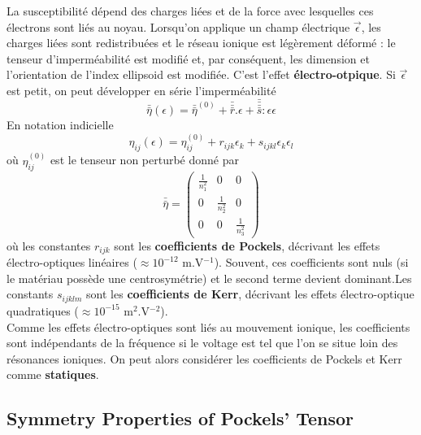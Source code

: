 La susceptibilité dépend des charges liées et de la force avec lesquelles ces électrons sont liés au
noyau. Lorsqu'on applique un champ électrique $\vec{\epsilon}$, les charges liées sont redistribuées et
le réseau ionique est légèrement déformé : le tenseur d'imperméabilité est modifié et, par conséquent, 
les dimension et l'orientation de l'index ellipsoid est modifiée. C'est l'effet \textbf{électro-otpique}. Si
$\vec{\epsilon}$ est petit, on peut développer en série l'imperméabilité
\begin{equation}
\bar{\bar{\eta}}(\epsilon) = \bar{\bar{\eta}}^{(0)}+\bar{\bar{\bar{r}}}.\epsilon + \bar{\bar{\bar{\bar{s}}}}:
\epsilon\epsilon
\label{eq:6.1}
\end{equation}
En notation indicielle
\begin{equation}
\eta_{ij}(\epsilon) = \eta_{ij}^{(0)}+r_{ijk}\epsilon_k+s_{ijkl}\epsilon_k\epsilon_l
\end{equation}
où $\eta_{ij}^{(0)}$ est le tenseur non perturbé donné par
\begin{equation}
\bar{\bar{\eta}} = \left(\begin{array}{ccc}
\frac{1}{n^2_1}&0&0\\
0&\frac{1}{n^2_2}&0\\
0&0&\frac{1}{n^2_3}
\end{array}\right)
\end{equation}
où les constantes $r_{ijk}$ sont les \textbf{coefficients de Pockels}, décrivant les effets électro-optiques
linéaires ($\approx 10^{-12}$ m.V$^{-1}$). Souvent, ces coefficients sont nuls (si le matériau possède une
centrosymétrie) et le second terme devient dominant.Les constants $s_{ijklm}$ sont les \textbf{coefficients
de Kerr}, décrivant les effets électro-optique quadratiques ($\approx 10^{-15}$ m$^2$.V$^{-2}$). \\

Comme les effets électro-optiques sont liés au mouvement ionique, les coefficients sont indépendants de la
fréquence si le voltage est tel que l'on se situe loin des résonances ioniques. On peut alors considérer
les coefficients de Pockels et Kerr comme \textbf{statiques}.

\subsection{Symmetry Properties of Pockels’ Tensor}
